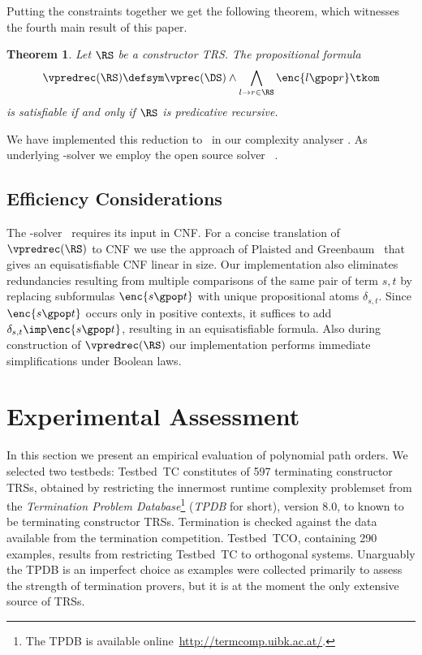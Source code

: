 \documentclass{LMCS}
\newtheorem{theorem}[thm]{Theorem}
\begin{document}
Putting the constraints together we get the following theorem,
which witnesses the fourth main result of this paper.
\begin{theorem}
  Let $\RS$ be a constructor TRS.\@ 
  The propositional formula 
  $$
  \vpredrec(\RS) \defsym \vprec(\DS) \wedge \bigwedge_{{l \to r} \in \RS} \enc{l \gpop r}
  \tkom
  $$
  is satisfiable if and only if $\RS$ is predicative recursive.
\end{theorem}

We have implemented this reduction to \SAT~in our complexity analyser \TCT.\@
As underlying \SAT-solver we employ the open source solver \minisat~\cite{ES03}.


\subsection{Efficiency Considerations}
The \SAT-solver \minisat\ requires its input in CNF.\@
For a concise translation of $\vpredrec(\RS)$ to CNF 
we use the approach of Plaisted and Greenbaum~\cite{PG86} that 
gives an equisatisfiable CNF linear in size.
Our implementation also eliminates redundancies resulting from 
multiple comparisons of the same pair of term $s, t$ by 
replacing subformulas $\enc{s \gpop t}$ with unique 
propositional atoms $\delta_{s,t}$. Since $\enc{s \gpop t}$ 
occurs only in positive contexts, it suffices to 
add $\delta_{s,t} \imp \enc{s \gpop t}$, resulting in an equisatisfiable formula.
Also during construction of $\vpredrec(\RS)$ our implementation
performs immediate simplifications under Boolean laws.





\section{Experimental Assessment}\label{s:exps}

In this section we present an empirical evaluation of polynomial path orders.
We selected two testbeds: Testbed~\textsf{TC} constitutes 
of 597 terminating constructor TRSs, obtained
by restricting the innermost runtime complexity problemset 
from the \emph{Termination Problem Database}\footnote{The TPDB is available online~\url{http://termcomp.uibk.ac.at/}.} 
(\emph{TPDB} for short), version 8.0,
to known to be terminating constructor TRSs.
Termination is checked against the data available from the termination competition.
Testbed~\textsf{TCO}, containing 290 examples, results from restricting Testbed~\textsf{TC} to 
orthogonal systems.
Unarguably the TPDB is an imperfect choice as examples were collected primarily to 
assess the strength of termination provers, but it is at the moment the only 
extensive source of TRSs. 
\end{document}

